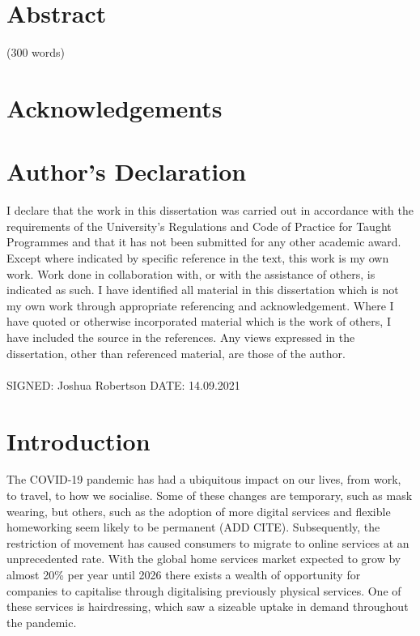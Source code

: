 \documentclass[12pt]{article}
\begin{document}
	\section*{Abstract}
	(300 words)
	
	\pagebreak

	\section*{Acknowledgements}
	\pagebreak
	
	\section*{Author's Declaration}

	I declare that the work in this dissertation was carried out in accordance with the 
	requirements of the University’s Regulations and Code of Practice for Taught Programmes 
	and that it has not been submitted for any other academic award.  Except where indicated 
	by specific reference in the text, this work is my own work. Work done in collaboration with, 
	or with the assistance of others, is indicated as such. I have identified all material in this 
	dissertation which is not my own work through appropriate referencing and 
	acknowledgement. Where I have quoted or otherwise incorporated material which is the 
	work of others, I have included the source in the references.  Any views expressed in the 
	dissertation, other than referenced material, are those of the author. 
	\\
	\\
	SIGNED: Joshua Robertson DATE: 14.09.2021 
	
	\pagebreak
	
	\tableofcontents
	\pagebreak
	
	\listoffigures
	\pagebreak
	
	\section{Introduction}


	
	
	The COVID-19 pandemic has had a ubiquitous impact on our lives, from work, to travel, to how we socialise. Some of these changes are temporary, such as mask wearing, but others, such as the adoption of more digital services and flexible homeworking seem likely to be permanent (ADD CITE). 
	Subsequently, the restriction of movement has caused consumers to migrate to online services at an unprecedented rate. With the global home services market expected to grow by almost 20\% per year until 2026 \cite{owen-ray} there exists a wealth of opportunity for companies to capitalise through digitalising previously physical services. One of these services is hairdressing, which saw a sizeable uptake in demand throughout the pandemic. 
	\\
	
\end{document}
